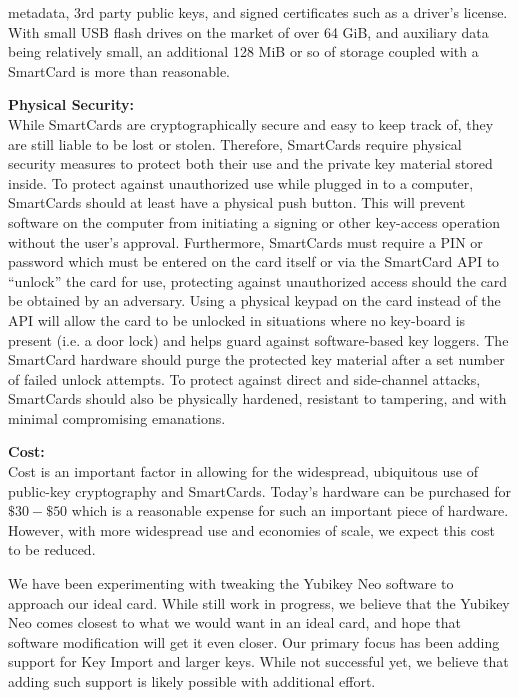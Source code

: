 \documentclass[11pt, twocolumn]{article}
\newenvironment{packed_desc}{
\begin{description}
  \setlength{\itemsep}{1pt}
  \setlength{\parskip}{0pt}
  \setlength{\parsep}{0pt}
}{\end{description}}
\begin{document}
\begin{packed_desc}
  metadata, 3rd party public keys, and signed certificates such as a
  driver's license. With small USB flash drives on the market of over
  64 GiB, and auxiliary data being relatively small, an additional 128
  MiB or so of storage coupled with a SmartCard is more than
  reasonable.
\item{\textbf{Physical Security:}} \\ \hfill While SmartCards are
  cryptographically secure and easy to keep track of, they are still
  liable to be lost or stolen. Therefore, SmartCards require physical
  security measures to protect both their use and the private key
  material stored inside. To protect against unauthorized use while
  plugged in to a computer, SmartCards should at least have a physical
  push button. This will prevent software on the computer from
  initiating a signing or other key-access operation without the
  user's approval. Furthermore, SmartCards must require a PIN or
  password which must be entered on the card itself or via the
  SmartCard API to ``unlock'' the card for use, protecting against
  unauthorized access should the card be obtained by an
  adversary. Using a physical keypad on the card instead of the API
  will allow the card to be unlocked in situations where no key-board
  is present (i.e. a door lock) and helps guard against software-based
  key loggers. The SmartCard hardware should purge the protected key
  material after a set number of failed unlock attempts. To protect
  against direct and side-channel attacks, SmartCards should also be
  physically hardened, resistant to tampering, and with minimal
  compromising emanations.
\item{\textbf{Cost:}} \\ \hfill Cost is an important factor in
  allowing for the widespread, ubiquitous use of public-key
  cryptography and SmartCards. Today's hardware can be purchased for
  $\$30 - \$50$ which is a reasonable expense for such an important
  piece of hardware. However, with more widespread use and economies
  of scale, we expect this cost to be reduced.
\end{packed_desc}

We have been experimenting with tweaking the Yubikey Neo software to
approach our ideal card. While still work in progress, we believe that
the Yubikey Neo comes closest to what we would want in an ideal card,
and hope that software modification will get it even closer. Our
primary focus has been adding support for Key Import and larger
keys. While not successful yet, we believe that adding such support is
likely possible with additional effort.
\end{document}
